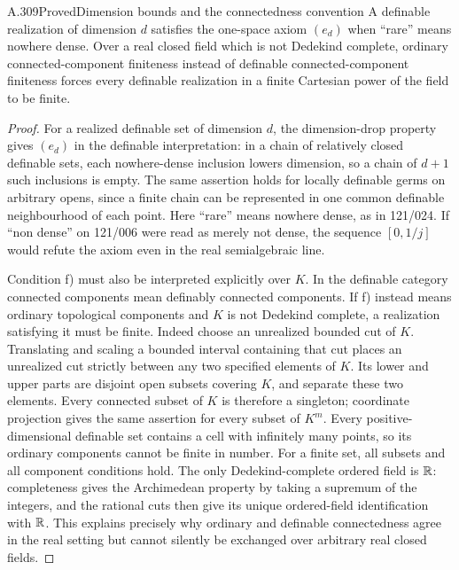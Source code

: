 \begin{saresult}{A.309}{Proved}{Dimension bounds and the connectedness convention}
A definable realization of dimension $d$ satisfies the one-space
axiom $(e_d)$ when ``rare'' means nowhere dense. Over a real closed
field which is not Dedekind complete, ordinary connected-component
finiteness instead of definable connected-component finiteness
forces every definable realization in a finite Cartesian power
of the field to be finite.
\end{saresult}
\begin{proof}
For a realized definable set of dimension $d$, the dimension-drop
property gives $(e_d)$ in the definable interpretation: in a chain
of relatively closed definable sets, each nowhere-dense inclusion
lowers dimension, so a chain of $d+1$ such inclusions is empty.
The same assertion holds for locally definable germs on arbitrary
opens, since a finite chain can be represented in one common
definable neighbourhood of each point. Here ``rare'' means
nowhere dense, as in 121/024. If ``non dense'' on 121/006 were read
as merely not dense, the sequence $[0,1/j]$ would refute the
axiom even in the real semialgebraic line.

Condition f) must also be interpreted explicitly over $K$.
In the definable category connected components mean definably
connected components. If f) instead means ordinary topological
components and $K$ is not Dedekind complete, a realization
satisfying it must be finite. Indeed choose an unrealized bounded
cut of $K$. Translating and scaling a bounded interval containing
that cut places an unrealized cut strictly between any two
specified elements of $K$. Its lower and upper parts are disjoint
open subsets covering $K$, and separate these two elements.
Every connected subset of $K$ is therefore a singleton; coordinate
projection gives the same assertion for every subset of $K^m$.
Every positive-dimensional definable set contains a cell with
infinitely many points, so its ordinary components cannot be
finite in number. For a finite set, all subsets and all component
conditions hold. The only Dedekind-complete ordered field is
$\mathbb R$: completeness gives the Archimedean property by taking a
supremum of the integers, and the rational cuts then give its
unique ordered-field identification with $\mathbb R$. This explains
precisely why ordinary and definable connectedness agree in the
real setting but cannot silently be exchanged over arbitrary
real closed fields.
\end{proof}

